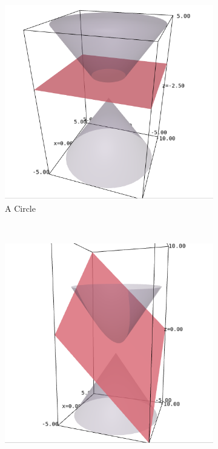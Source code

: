 \documentclass{article}
\theoremstyle{definition}
\begin{document}
\begin{figure}[H]
\centering
\begin{subfigure}[b]{0.3\textwidth}
\includegraphics[width=\textwidth]{Selection_050}
\caption{A Circle}
\label{fig:gull21}
\end{subfigure}
~ %
\begin{subfigure}[b]{0.3\textwidth}
\includegraphics[width=\textwidth]{Selection_051}

\end{subfigure}
\end{figure}
\end{document}
